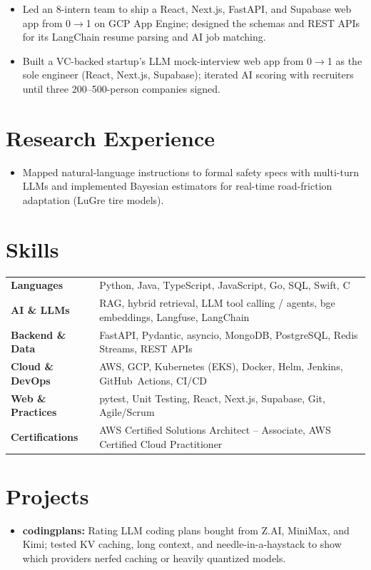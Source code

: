 \documentclass[11pt, letterpaper]{article}
\begin{document}
\vspace{1pt}
\begin{itemize}
  \item Led an 8-intern team to ship a React, Next.js, FastAPI, and Supabase web app from 0$\to$1 on GCP App Engine; designed the schemas and REST APIs for its LangChain resume parsing and AI job matching.
\end{itemize}

\vspace{1pt}
\begin{itemize}
  \item Built a VC-backed startup's LLM mock-interview web app from 0$\to$1 as the sole engineer (React, Next.js, Supabase); iterated AI scoring with recruiters until three 200--500-person companies signed.
\end{itemize}

\section{Research Experience}
\begin{itemize}
  \item Mapped natural-language instructions to formal safety specs with multi-turn LLMs and implemented Bayesian estimators for real-time road-friction adaptation (LuGre tire models).
\end{itemize}

\section{Skills}
\begin{tabularx}{\textwidth}{@{}l @{\hspace{7pt}} >{\raggedright\arraybackslash}X@{}}
  \textbf{Languages} & Python, Java, TypeScript, JavaScript, Go, SQL, Swift, C \\[1pt]
  \textbf{AI \& LLMs} & RAG, hybrid retrieval, LLM tool calling / agents, bge embeddings, Langfuse, LangChain \\[1pt]
  \textbf{Backend \& Data} & FastAPI, Pydantic, asyncio, MongoDB, PostgreSQL, Redis Streams, REST APIs \\[1pt]
  \textbf{Cloud \& DevOps} & AWS, GCP, Kubernetes (EKS), Docker, Helm, Jenkins, GitHub~Actions, CI/CD \\[1pt]
  \textbf{Web \& Practices} & pytest, Unit Testing, React, Next.js, Supabase, Git, Agile/Scrum \\[1pt]
  \textbf{Certifications} & AWS Certified Solutions Architect -- Associate, AWS Certified Cloud Practitioner \\
\end{tabularx}

\section{Projects}
\begin{itemize}
  \item \textbf{codingplans:} Rating LLM coding plans bought from Z.AI, MiniMax, and Kimi; tested KV caching, long context, and needle-in-a-haystack to show which providers nerfed caching or heavily quantized models.
\end{itemize}
\end{document}

